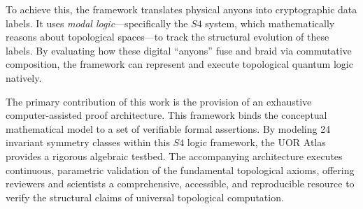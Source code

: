 To achieve this, the framework translates physical anyons into cryptographic data labels. It uses \textit{modal logic}—specifically the $S4$ system, which mathematically reasons about topological spaces—to track the structural evolution of these labels. By evaluating how these digital ``anyons'' fuse and braid via commutative composition, the framework can represent and execute topological quantum logic natively.

The primary contribution of this work is the provision of an exhaustive computer-assisted proof architecture. This framework binds the conceptual mathematical model to a set of verifiable formal assertions. By modeling 24 invariant symmetry classes within this $S4$ logic framework, the UOR Atlas provides a rigorous algebraic testbed. The accompanying architecture executes continuous, parametric validation of the fundamental topological axioms, offering reviewers and scientists a comprehensive, accessible, and reproducible resource to verify the structural claims of universal topological computation.
